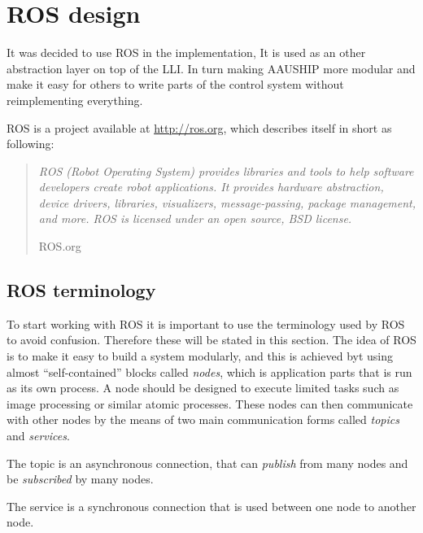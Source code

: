 \chapter{\acs{ROS} design}

It was decided to use \ac{ROS} in the implementation, It is used as
an other abstraction layer on top of the \ac{LLI}. In turn making
AAUSHIP more modular and make it easy for others to write parts of the
control system without reimplementing everything. 

\ac{ROS} is a project available at \url{http://ros.org}, which
describes itself in short as following:

\begin{quote}
\noindent	\textit{
	ROS (Robot Operating System) provides libraries and
	tools to help software developers create robot applications. It
	provides hardware abstraction, device drivers, libraries,
	visualizers, message-passing, package management, and more. ROS is
licensed under an open source, BSD license.}
		
	\hfill ROS.org
\end{quote}



\section{\acs{ROS} terminology}
To start working with \ac{ROS} it is important to use the terminology
used by \ac{ROS} to avoid confusion. Therefore these  will be stated in this section.
The idea of \ac{ROS} is to make it easy to build a system modularly,
and this is achieved byt using almost ``self-contained'' blocks called
\textit{nodes}, which is application parts that is run as its own
process. A node should be designed to execute limited tasks such as
image processing or similar atomic processes. These nodes can then
communicate with other nodes by the means of two main communication
forms called \textit{topics} and \textit{services}.

The topic is an asynchronous connection, that can \textit{publish} from many
nodes and be \textit{subscribed} by many nodes.

The service is a synchronous connection that is used between one node
to another node.



